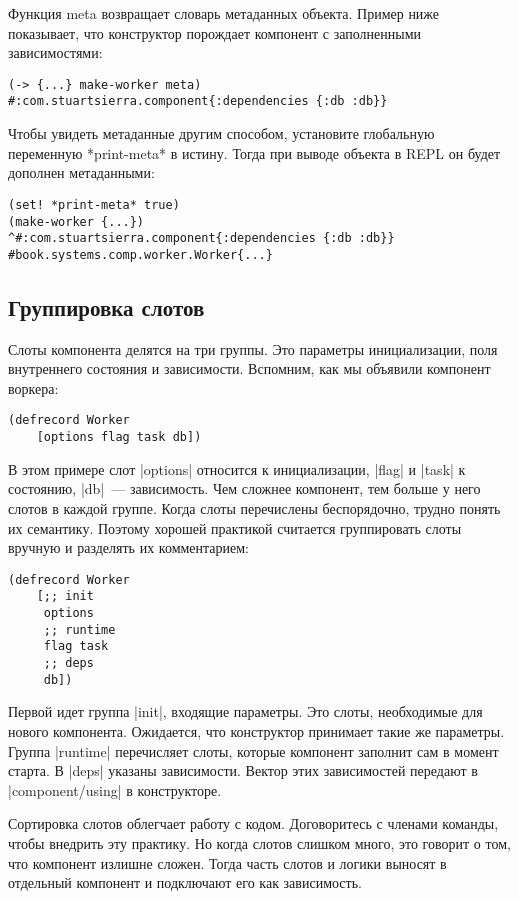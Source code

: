 Функция meta возвращает словарь метаданных объекта. Пример ниже показывает, что
конструктор порождает компонент с заполненными зависимостями:

\begin{verbatim}
(-> {...} make-worker meta)
#:com.stuartsierra.component{:dependencies {:db :db}}
\end{verbatim}

Чтобы увидеть метаданные другим способом, установите глобальную переменную
*print-meta* в истину. Тогда при выводе объекта в REPL он будет дополнен
метаданными:

\begin{verbatim}
(set! *print-meta* true)
(make-worker {...})
^#:com.stuartsierra.component{:dependencies {:db :db}}
#book.systems.comp.worker.Worker{...}
\end{verbatim}

\subsection{Группировка слотов}

Слоты компонента делятся на три группы. Это параметры инициализации, поля
внутреннего состояния и зависимости. Вспомним, как мы объявили компонент
воркера:

\begin{verbatim}
(defrecord Worker
    [options flag task db])
\end{verbatim}

В этом примере слот \spverb|options| относится к инициализации, \spverb|flag| и \spverb|task| к
состоянию, \spverb|db|~--- зависимость. Чем сложнее компонент, тем больше у него слотов в
каждой группе. Когда слоты перечислены беспорядочно, трудно понять их
семантику. Поэтому хорошей практикой считается группировать слоты вручную и
разделять их комментарием:

\begin{verbatim}
(defrecord Worker
    [;; init
     options
     ;; runtime
     flag task
     ;; deps
     db])
\end{verbatim}

Первой идет группа \spverb|init|, входящие параметры. Это слоты, необходимые для нового
компонента. Ожидается, что конструктор принимает такие же параметры. Группа
\spverb|runtime| перечисляет слоты, которые компонент заполнит сам в момент старта. В
\spverb|deps| указаны зависимости. Вектор этих зависимостей передают в
\spverb|component/using| в конструкторе.

Сортировка слотов облегчает работу с кодом. Договоритесь с членами команды,
чтобы внедрить эту практику. Но когда слотов слишком много, это говорит о том,
что компонент излишне сложен. Тогда часть слотов и логики выносят в отдельный
компонент и подключают его как зависимость.

